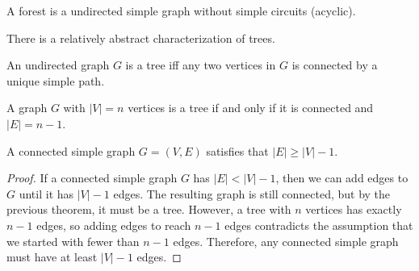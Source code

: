 \begin{definition}[Forests]
A forest is a undirected simple graph without simple circuits (acyclic).
\end{definition}

There is a relatively abstract characterization of trees.

\begin{theorem}
An undirected graph $G$ is a tree iff any two vertices in $G$ is connected by a unique simple path.
\end{theorem}

\begin{theorem}
A graph $G$ with $|V|=n$ vertices is a tree if and only if it is connected and $|E|=n-1$.
\end{theorem}

\begin{theorem}[Corollary]
A connected simple graph $G=(V,E)$ satisfies that $|E| \geq |V|-1$.
\end{theorem}

\begin{proof}
If a connected simple graph $G$ has $|E| < |V|-1$, then we can add edges to $G$ until it has $|V|-1$ edges. The resulting graph is still connected, but by the previous theorem, it must be a tree. However, a tree with $n$ vertices has exactly $n-1$ edges, so adding edges to reach $n-1$ edges contradicts the assumption that we started with fewer than $n-1$ edges. Therefore, any connected simple graph must have at least $|V|-1$ edges.
\end{proof}

